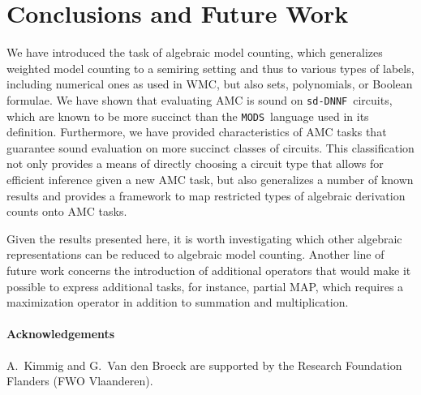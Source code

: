 \documentclass{article}
\theoremstyle{plain}
\theoremstyle{definition}
\newcommand{\sdDNNF}{{\tt sd-DNNF}}
\newcommand{\MODS}{{\tt MODS}}
\begin{document}
\section{Conclusions and Future Work}\label{sec:fw}
We have introduced the task of algebraic model counting, which
generalizes weighted model counting to a semiring setting and thus
to various types of labels, including numerical ones as used in WMC,  but also sets,
polynomials, or Boolean formulae. We have shown that evaluating
AMC  is sound on \sdDNNF\ circuits, which are known
to be more succinct than the \MODS\ language used in its definition. Furthermore, we have provided characteristics of AMC tasks that
guarantee sound evaluation on more succinct classes of circuits.
This classification not only provides a means of directly choosing a circuit type
that allows for efficient inference given a new AMC task, but also 
generalizes a number of known results
and provides a framework to map restricted types of algebraic
derivation 
counts onto AMC tasks. 

Given the results presented here, it is worth investigating which other algebraic representations can be reduced to
algebraic model counting. 
Another line of future work concerns the introduction of additional
operators that would make it possible to express additional tasks, for
instance, partial MAP, which requires a maximization
operator in addition to summation and multiplication. 


\paragraph{Acknowledgements} A.~Kimmig and G.~Van den Broeck are
supported by the Research Foundation Flanders (FWO Vlaanderen).
\end{document}
